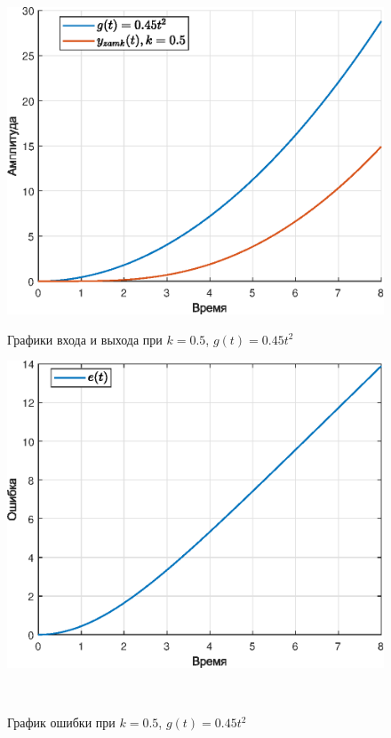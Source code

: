 \documentclass[a4paper]{article}
\begin{document}
\begin{figure}[H]
    \begin{minipage}{0.5\textwidth}
        \centering \includegraphics[width=\textwidth]{ex4/k0.5_g_at2.eps}
        \caption{Графики входа и выхода при $k=0.5$, $g(t)=0.45t^2$}
    \end{minipage}\hfill
    \begin{minipage}{0.5\textwidth}
        \centering \includegraphics[width=\textwidth]{ex4/k0.5_g_at2_error.eps}
        \caption{График ошибки при $k=0.5$, $g(t)=0.45t^2$}
    \end{minipage}\\[1em]
\end{figure}\noindent\
\end{document}
